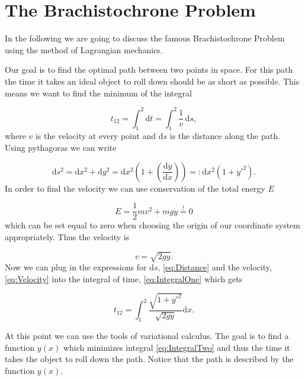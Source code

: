 \documentclass[12pt,a4paper]{exam}
\begin{document}
\section*{The Brachistochrone Problem}

  In the following we are going to discuss the famous Brachistochrone Problem using the method of Lagrangian mechanics. 

  Our goal is to find the optimal path between two points in space. For this path the time it takes an ideal object to roll down should be as short as possible. This means we want to find the minimum of the integral
  
    \begin{equation}
      t_{12} = \int_1^2 \text{d}t = \int_1^2 \frac{1}{v} \, \text{d}s, \label{eq:IntegralOne}
    \end{equation}
  where $v$ is the velocity at every point and $\text{d}s$ is the distance along the path. Using pythagoras we can write 
    
    \begin{equation}
      \text{d} s^2 = \text{d} x^2 + \text{d} y^2 = \text{d} x^2 \left(1 + \left(\frac{\text{d} y}{\text{d} x}\right)\right) =: \text{d} x^2 \left(1 + y'^2\right). \label{eq:Distance} 
    \end{equation}      
  In order to find the velocity we can use conservation of the total energy $E$
    
    \begin{equation}
      E = \frac{1}{2}mv^2 + mgy \overset{!}{=} 0 
    \end{equation}
  which can be set equal to zero when choosing the origin of our coordinate system appropriately. Thus the velocity is
  
    \begin{equation}
      v = \sqrt{2gy}. \label{eq:Velocity}
    \end{equation} 
  Now we can plug in the expressions for $\text{d}s$, \eqref{eq:Distance} and the velocity, \eqref{eq:Velocity} into the integral of time, \eqref{eq:IntegralOne} which gets
    
    \begin{equation}
      t_{12} = \int_1^2 \frac{\sqrt{1 + y'^2}}{\sqrt{2gy}} \text{d}x. \label{eq:IntegralTwo}
    \end{equation}
  
  At this point we can use the tools of variational calculus. The goal is to find a function $y(x)$ which minimizes integral \eqref{eq:IntegralTwo} and thus the time it takes the object to roll down the path. Notice that the path is described by the function $y(x)$. 
  
\end{document}
